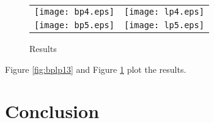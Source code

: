 \documentclass{article}
\begin{document}
\begin{figure}[t]
  \begin{tabular}{cc}
   \texttt{[image: bp4.eps]} & \texttt{[image: lp4.eps]} \\
   \texttt{[image: bp5.eps]} & \texttt{[image: lp5.eps]} \\
  \end{tabular}
  \caption{Results}
  \label{fig:bplp45}
\end{figure}

Figure \ref{fig:bplp13} and Figure \ref{fig:bplp45} plot the results.

\section{Conclusion}
\label{s:Conclusion}




\end{document}
